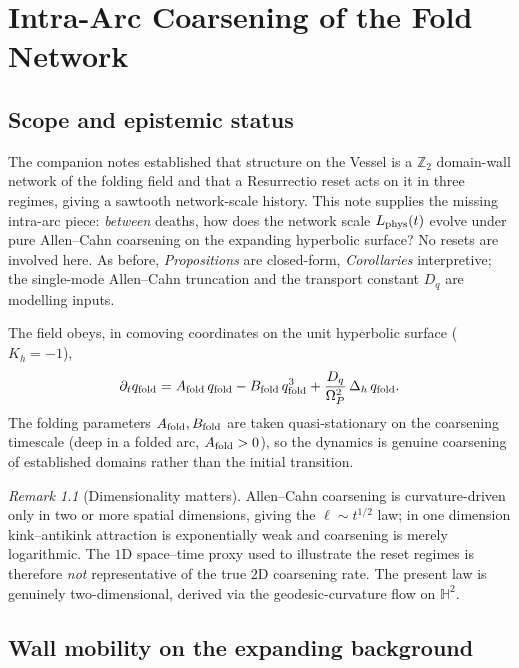 \documentclass[11pt,a4paper,oneside]{book}
\newcommand{\Op}{\Omega_P}
\newcommand{\qf}{q_{\rm fold}}
\newcommand{\Af}{A_{\rm fold}}
\newcommand{\Bf}{B_{\rm fold}}
\newcommand{\Hh}{\mathbb{H}^2}
\newcommand{\laph}{\Delta_h}
\newcommand{\Dq}{D_q}
\newcommand{\Lphys}{L_{\rm phys}}
\theoremstyle{plain}
\theoremstyle{definition}
\theoremstyle{remark}
\newtheorem*{remark}{Remark}
\begin{document}
\chapter{Intra-Arc Coarsening of the Fold Network}

\section*{Scope and epistemic status}
The companion notes established that structure on the Vessel is a $\mathbb Z_2$ domain-wall network of the
folding field and that a Resurrectio reset acts on it in three regimes, giving a sawtooth network-scale
history. This note supplies the missing intra-arc piece: \emph{between} deaths, how does the network scale
$\Lphys(t)$ evolve under pure Allen--Cahn coarsening on the expanding hyperbolic surface? No resets are
involved here. As before, \emph{Propositions} are closed-form, \emph{Corollaries} interpretive; the
single-mode Allen--Cahn truncation and the transport constant $\Dq$ are modelling inputs.

The field obeys, in comoving coordinates on the unit hyperbolic surface ($K_h=-1$),
\begin{equation}\label{coarseninglaw:eq:ac}
\partial_t\qf=\Af\,\qf-\Bf\,\qf^{3}+\frac{\Dq}{\Op^{2}}\,\laph\,\qf .
\end{equation}
The folding parameters $\Af,\Bf$ are taken quasi-stationary on the coarsening timescale (deep in a folded
arc, $\Af>0$), so the dynamics is genuine coarsening of established domains rather than the initial
transition.

\begin{remark}[Dimensionality matters]
Allen--Cahn coarsening is curvature-driven only in two or more spatial dimensions, giving the
$\ell\sim t^{1/2}$ law; in one dimension kink--antikink attraction is exponentially weak and coarsening is
merely logarithmic. The $1$D space--time proxy used to illustrate the reset regimes is therefore
\emph{not} representative of the true $2$D coarsening rate. The present law is genuinely two-dimensional,
derived via the geodesic-curvature flow on $\Hh$.
\end{remark}

\section{Wall mobility on the expanding background}
\end{document}
